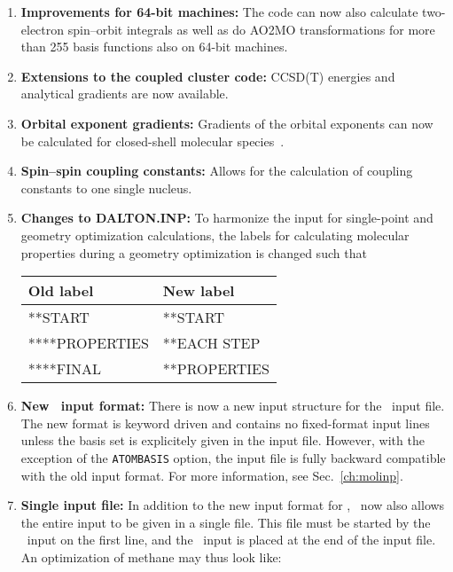\begin{enumerate}
\item{\bf Improvements for 64-bit machines:} The code can now also
  calculate two-electron spin--orbit integrals as well as do AO2MO
  transformations for more than 255 basis functions also on 64-bit
  machines.

\item{\bf Extensions to the coupled cluster code:} CCSD(T) energies
  and analytical gradients are now available.

\item{\bf Orbital exponent gradients:} Gradients of the orbital
exponents can now be calculated for closed-shell molecular
species~\cite{fjjcp115}. 

\item{\bf Spin--spin coupling constants:} Allows for the calculation
  of coupling constants to one single nucleus.

\item{\bf Changes to DALTON.INP:} To harmonize the input for
  single-point and geometry optimization calculations, the labels for
  calculating   molecular properties during a geometry optimization is
  changed such that

\begin{center}
\begin{tabular}{|l|l|}\hline
Old label & New label\\\hline
**START & **START\\
****PROPERTIES & **EACH STEP\\
****FINAL & **PROPERTIES\\\hline
\end{tabular}
\end{center}

\item{\bf New \mol\ input format:} There is now a new input structure
  for the \mol\ input file. The new format is keyword driven and
  contains no fixed-format input lines unless the basis set is
  explicitely given in the input file. However, with the exception of
  the \verb|ATOMBASIS| option, the input file is fully backward
  compatible with the old input format. For more information, see
  Sec.~\ref{ch:molinp}.

\item{\bf Single input file:} In addition to the new input format for
  \dalton , \dalton\ now also allows the entire input to be given in a
  single file. This file must be started by the \mol\ input on the
  first line, and the \dalton\ input is placed at the end of the input
  file. An optimization of methane may thus look like:


\end{enumerate}
